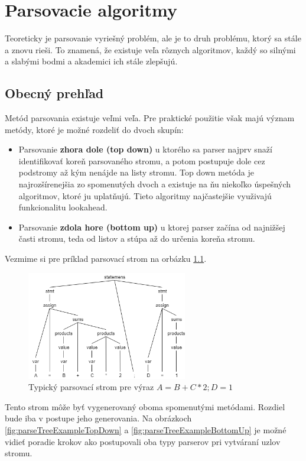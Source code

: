 \chapter{Parsovacie algoritmy}
Teoreticky je parsovanie vyriešný problém, ale je to druh problému, ktorý sa stále a znovu rieši. To znamená, že existuje veľa rôznych algoritmov, každý so silnými a slabými bodmi a akademici ich stále zlepšujú.\cite{tomassetti:parsing}

\section{Obecný prehľad}\label{parsing-alg-basics}
Metód parsovania existuje veľmi veľa. Pre praktické použitie však majú význam metódy, ktoré je možné rozdeliť do dvoch skupín:\cite{CVUT:program_language}
\begin{itemize}
\item Parsovanie \textbf{zhora dole (top down)} u ktorého sa parser najprv snaží identifikovať koreň parsovaného stromu, a potom postupuje dole cez podstromy až kým nenájde na listy stromu. Top down metóda je najrozšírenejšia zo spomenutých dvoch a existuje na ňu niekoľko úspešných algoritmov, ktoré ju uplatňujú. Tieto algoritmy najčastejšie využivajú funkcionalitu lookahead.
\item Parsovanie \textbf{zdola hore (bottom up)} u ktorej parser začína od najnižšej časti stromu, teda od listov a stúpa až do určenia koreňa stromu. 
\end{itemize}

Vezmime si pre príklad parsovací strom na orbázku \ref{fig:parseTreeExample}. 
\begin{figure}[H]
\begin{center}
\includegraphics[width=7cm]{figures/parseTreeExample.png}
\caption{Typický parsovací strom pre výraz $A = B + C*2;  D = 1$}
\label{fig:parseTreeExample}
\end{center}
\end{figure}

Tento strom môže byť vygenerovaný oboma spomenutými metódami. Rozdiel bude iba v postupe jeho generovania. Na obrázkoch \ref{fig:parseTreeExampleTopDown} a \ref{fig:parseTreeExampleBottomUp} je možné vidieť poradie krokov ako postupovali oba typy parserov pri vytváraní uzlov stromu.

